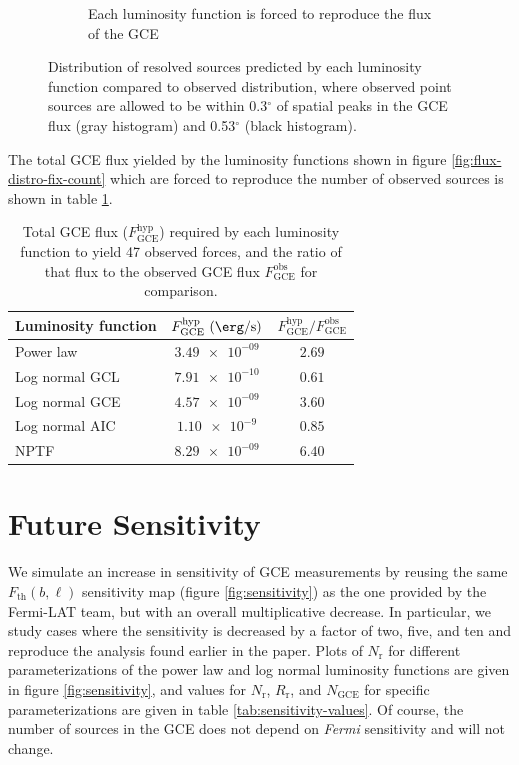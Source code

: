 \documentclass[a4paper,11pt]{article}
\newcommand{\comment}[1]{\emph{\color{red}{#1}}}
\begin{document}
\begin{figure}
\begin{subfigure}[b]{0.47\textwidth}
        \caption{Each luminosity function is forced to reproduce the flux of the GCE}
        \label{fig:flux-distro-fix-flux}
    \end{subfigure}
    \caption{Distribution of resolved sources predicted by each luminosity function compared to observed distribution, where observed point sources are allowed to be within 0.3$^\circ$ of spatial peaks in the GCE flux (gray histogram) and 0.53$^\circ$ (black histogram).}
\end{figure}

The total GCE flux yielded by the luminosity functions shown in figure \ref{fig:flux-distro-fix-count} which are forced to reproduce the number of observed sources is shown in table \ref{tab:rescaled-gce-flux}.

\begin{table}
    \centering
    \begin{tabular} {|l|c|c|}
        \hline
        Luminosity function & $F_\text{GCE}^\text{hyp}\ (\SI{}{\erg\per\second})$ & $F^\text{hyp}_\text{GCE} / F^\text{obs}_\text{GCE}$\\ \hline \hline
        Power law & $\num{3.49e-09}$ & $\num{2.69}$\\
        Log normal GCL & $\num{7.91e-10}$ & $\num{0.61}$ \\
        Log normal GCE & $\num{4.57e-09}$ & $\num{3.60}$\\
        Log normal AIC & $\num{1.10e-9}$ & $\num{0.85}$ \\
        NPTF & $\num{8.29e-09}$ & $\num{6.40}$\\
        \hline
    \end{tabular}
    \caption{Total GCE flux ($F_\text{GCE}^\text{hyp}$) required by each luminosity function to yield 47 observed forces, and the ratio of that flux to the observed GCE flux $F_\text{GCE}^\text{obs}$ for comparison.}
    \label{tab:rescaled-gce-flux}
\end{table}



\section{Future Sensitivity}
We simulate an increase in sensitivity of GCE measurements by reusing the same $F_\text{th}(b, \ell)$ sensitivity map (figure \ref{fig:sensitivity}) as the one provided by the Fermi-LAT team, but with an overall multiplicative decrease. In particular, we study cases where the sensitivity is decreased by a factor of two, five, and ten and reproduce the analysis found earlier in the paper. Plots of $N_\text{r}$ for different parameterizations of the power law and log normal luminosity functions are given in figure \ref{fig:sensitivity}, and values for $N_\text{r}$, $R_\text{r}$, and $N_\text{GCE}$ for specific parameterizations are given in table \ref{tab:sensitivity-values}. Of course, the number of sources in the GCE does not depend on \textit{Fermi} sensitivity and will not change. \comment{That means that the backgrounds of the column plots do not change from plot to plot. I could put them all on the same thing.}
\end{document}

